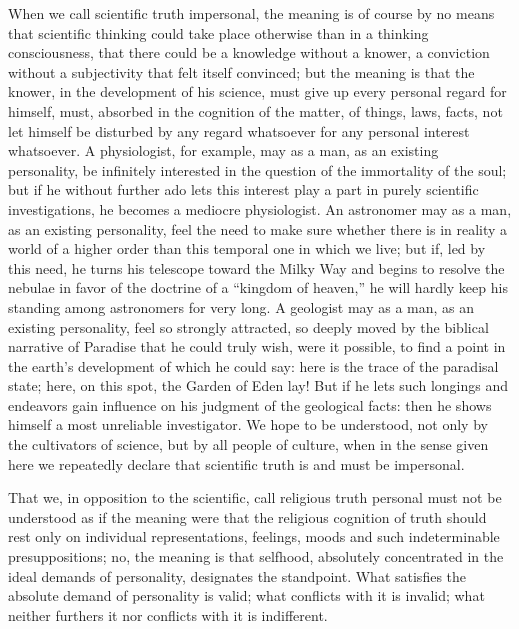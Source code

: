 \documentclass[12pt]{book}
\newcommand{\opage}[1]{\marginnote{\footnotesize\textit{[#1]}}}
\begin{document}
When we call scientific truth impersonal, the meaning is of course by no
means that scientific thinking could take place otherwise than in a
thinking consciousness, that there could be a knowledge without a knower, a
conviction without a subjectivity that felt itself convinced; but the
meaning is that the knower, in the development of his science, must give
up every personal regard for himself, must, absorbed in the cognition of
the matter, of things, laws, facts, not let himself be disturbed by any
regard whatsoever for any personal interest whatsoever. A physiologist, for
example, may as a man, as an existing personality, be infinitely
interested in the question of the immortality of the soul; but if he
without further ado lets this interest play a
\opage{196}\setcounter{footnote}{0}%
part in purely scientific investigations, he becomes a mediocre
physiologist. An astronomer may as a man, as an existing personality, feel
the need to make sure whether there is in reality a world of a higher order
than this temporal one in which we live; but if, led by this need, he
turns his telescope toward the Milky Way and begins to resolve the nebulae
in favor of the doctrine of a ``kingdom of heaven,'' he will hardly keep
his standing among astronomers for very long. A geologist may as a man, as
an existing personality, feel so strongly attracted, so deeply moved by the
biblical narrative of Paradise that he could truly wish, were it possible,
to find a point in the earth's development of which he could say: here is
the trace of the paradisal state; here, on this spot, the Garden of Eden
lay! But if he lets such longings and endeavors gain influence on his
judgment of the geological facts: then he shows himself a most unreliable
investigator. We hope to be understood, not only by the cultivators of
science, but by all people of culture, when in the sense given here we
repeatedly declare that scientific truth is and must be impersonal.

That we, in opposition to the scientific, call religious truth personal
must not be understood as if the meaning were that the religious cognition
of truth should rest only on individual representations, feelings, moods
and such indeterminable presuppositions; no, the meaning is that selfhood,
absolutely concentrated in the ideal demands of personality, designates the
standpoint. What satisfies the absolute demand of personality is valid;
what conflicts with it is invalid; what neither furthers it nor conflicts
with it is indifferent.
\end{document}
